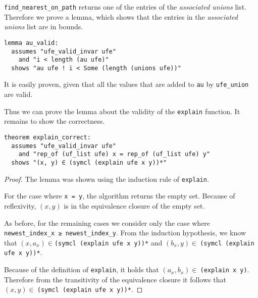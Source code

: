 \lstinline{find_nearest_on_path} returns one of the entries of the \emph{associated unions} list.
Therefore we prove a lemma, which shows that the entries in the \emph{associated unions} list are in bounds.

\begin{lstlisting}
lemma au_valid:
  assumes "ufe_valid_invar ufe"
    and "i < length (au ufe)"
  shows "au ufe ! i < Some (length (unions ufe))"
\end{lstlisting}

It is easily proven, given that all the values that are added to \lstinline|au| by \lstinline|ufe_union| are valid.

Thus we can prove the lemma about the validity of the \lstinline|explain| function.
It remains to show the correctness.

\begin{lstlisting}
theorem explain_correct:
  assumes "ufe_valid_invar ufe"
    and "rep_of (uf_list ufe) x = rep_of (uf_list ufe) y"
  shows "(x, y) ∈ (symcl (explain ufe x y))*"
\end{lstlisting}

\begin{proof}
The lemma was shown using the induction rule of \lstinline|explain|.

For the case where \lstinline|x = y|, the algorithm returns the empty set. Because of reflexivity, $(x, y)$ is in the equivalence closure of the empty set.

As before, for the remaining cases we consider only the case where \lstinline|newest_index_x ≥ newest_index_y|.
From the induction hypothesis, we know that $(x, a_x) \in$\lstinline{(symcl (explain ufe x y))*} and $(b_x, y) \in\:$\lstinline{(symcl (explain ufe x y))*}.

Because of the definition of \lstinline|explain|, it holds that $(a_x, b_x) \in\:$\lstinline{(explain x y)}. Therefore from the transitivity of the equivalence closure it follows that $(x, y) \in\:$\lstinline{(symcl (explain ufe x y))*}.
\end{proof}
